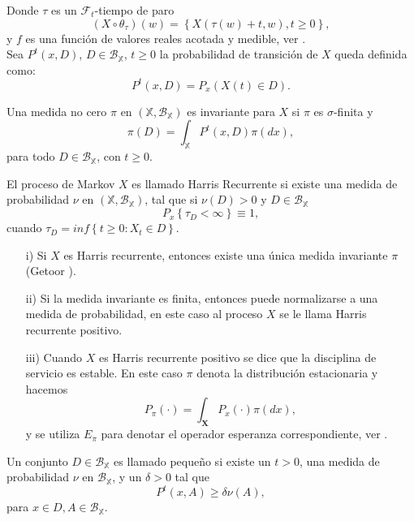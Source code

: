 Donde $\tau$ es un $\mathcal{F}_{t}$-tiempo de paro
\[\left(X\circ\theta_{\tau}\right)\left(w\right)=\left\{X\left(\tau\left(w\right)+t,w\right),t\geq0\right\},\]
y $f$ es una funci\'on de valores reales acotada y medible, ver \cite{Dai, KaspiMandelbaum}.\\

Sea $P^{t}\left(x,D\right)$, $D\in\mathcal{B}_{\mathbb{X}}$,
$t\geq0$ la probabilidad de transici\'on de $X$ queda definida
como:
\[P^{t}\left(x,D\right)=P_{x}\left(X\left(t\right)\in
D\right).\]


\begin{Def}
Una medida no cero $\pi$ en
$\left(\mathbb{X},\mathcal{B}_{\mathbb{X}}\right)$ es invariante
para $X$ si $\pi$ es $\sigma$-finita y
\[\pi\left(D\right)=\int_{\mathbb{X}}P^{t}\left(x,D\right)\pi\left(dx\right),\]
para todo $D\in \mathcal{B}_{\mathbb{X}}$, con $t\geq0$.
\end{Def}

\begin{Def}
El proceso de Markov $X$ es llamado Harris Recurrente si existe
una medida de probabilidad $\nu$ en
$\left(\mathbb{X},\mathcal{B}_{\mathbb{X}}\right)$, tal que si
$\nu\left(D\right)>0$ y $D\in\mathcal{B}_{\mathbb{X}}$
\[P_{x}\left\{\tau_{D}<\infty\right\}\equiv1,\] cuando
$\tau_{D}=inf\left\{t\geq0:X_{t}\in D\right\}$.
\end{Def}

\begin{Note}
\begin{itemize}
\item[i)] Si $X$ es Harris recurrente, entonces existe una \'unica
medida invariante $\pi$ (Getoor \cite{Getoor}).

\item[ii)] Si la medida invariante es finita, entonces puede
normalizarse a una medida de probabilidad, en este caso al proceso
$X$ se le llama Harris recurrente positivo.


\item[iii)] Cuando $X$ es Harris recurrente positivo se dice que
la disciplina de servicio es estable. En este caso $\pi$ denota la
distribuci\'on estacionaria y hacemos
\[P_{\pi}\left(\cdot\right)=\int_{\mathbf{X}}P_{x}\left(\cdot\right)\pi\left(dx\right),\]
y se utiliza $E_{\pi}$ para denotar el operador esperanza
correspondiente, ver \cite{DaiSean}.
\end{itemize}
\end{Note}

\begin{Def}\label{Def.Cto.Peq.}
Un conjunto $D\in\mathcal{B_{\mathbb{X}}}$ es llamado peque\~no si
existe un $t>0$, una medida de probabilidad $\nu$ en
$\mathcal{B_{\mathbb{X}}}$, y un $\delta>0$ tal que
\[P^{t}\left(x,A\right)\geq\delta\nu\left(A\right),\] para $x\in
D,A\in\mathcal{B_{\mathbb{X}}}$.
\end{Def}


